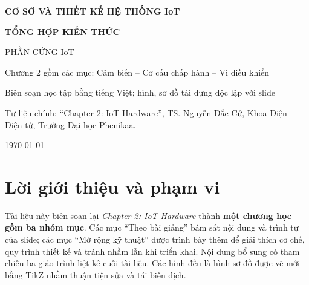 \documentclass[11pt,a4paper,oneside]{book}
\begin{document}
\frontmatter
\begin{titlepage}
\centering
\vspace*{2.0cm}
{\Large\color{blueiot}\bfseries CƠ SỞ VÀ THIẾT KẾ HỆ THỐNG IoT\par}
\vspace{1cm}
{\Huge\bfseries TỔNG HỢP KIẾN THỨC\par}
\vspace{0.5cm}
{\huge\color{tealiot} PHẦN CỨNG IoT\par}
\vspace{0.3cm}
{\Large Chương 2 gồm các mục: Cảm biến -- Cơ cấu chấp hành -- Vi điều khiển\par}
\vspace{1.5cm}
\vfill
{\large Biên soạn học tập bằng tiếng Việt; hình, sơ đồ tái dựng độc lập với slide\par}
\vspace{5mm}
{\small Tư liệu chính: ``Chapter 2: IoT Hardware'', TS. Nguyễn Đắc Cử, Khoa Điện -- Điện tử, Trường Đại học Phenikaa.\par}
\vspace{4mm}
{\large \today\par}
\end{titlepage}
\chapter*{Lời giới thiệu và phạm vi}
Tài liệu này biên soạn lại \emph{Chapter 2: IoT Hardware} thành \textbf{một chương học gồm ba nhóm mục}. Các mục ``Theo bài giảng'' bám sát nội dung và trình tự của slide; các mục ``Mở rộng kỹ thuật'' được trình bày thêm để giải thích cơ chế, quy trình thiết kế và tránh nhầm lẫn khi triển khai. Nội dung bổ sung có tham chiếu ba giáo trình liệt kê cuối tài liệu. Các hình đều là hình sơ đồ được vẽ mới bằng TikZ nhằm thuận tiện sửa và tái biên dịch.
\end{document}
